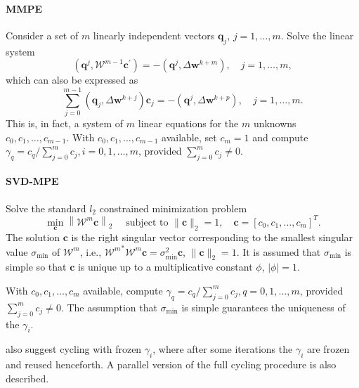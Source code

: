 \paragraph{MMPE}

Consider a set of \(m\) linearly independent vectors \(\mathbf q_j\), \(j=1, \dots, m\).
Solve the linear system
\begin{equation}
  \left(\mathbf q^{j}, \mathscr W^{m-1} \mathbf c^{\prime}\right)=-\left(\mathbf q^{j}, \Delta \mathbf w^{k+m}\right), \quad j=1, \ldots, m,
\end{equation}
which can also be expressed as
\begin{equation}
  \sum_{j=0}^{m-1}\left(\mathbf q_{j}, \Delta \mathbf w^{k+j}\right) \mathbf c_{j}=-\left(\mathbf q^{j}, \Delta \mathbf w^{k+p}\right), \quad j=1, \ldots, m.
\end{equation}
This is, in fact, a system of \(m\) linear equations for the \(m\) unknowns \(c_{0}, c_{1}, \ldots, c_{m-1}\).
With \(c_{0}, c_{1}, \ldots, c_{m-1}\) available, set \(c_{m}=1\) and compute \(\gamma_{q}=c_{q} / \sum_{j=0}^{m} c_{j}, i=0,1, \ldots, m\), provided \(\sum_{j=0}^{m} c_{j} \neq 0\).

\paragraph{SVD-MPE}

Solve the standard \(l_{2}\) constrained minimization problem
\begin{equation}
  \min_{\mathbf c}\left\|\mathscr W^{m} \mathbf c\right\|_{2} \quad \text { subject to }\|\mathbf c\|_{2}=1, \quad \mathbf c=\left[c_{0}, c_{1}, \ldots, c_{m}\right]^{T} .
\end{equation}
The solution \(\mathbf c\) is the right singular vector corresponding to the smallest singular value \(\sigma_{\min }\) of \(\mathscr W^{m}\), i.e., \({\mathscr W^{m}}^{*} \mathscr W^{m} \mathbf c=\sigma_{\min }^{2} \mathbf c\), \(\|\mathbf c\|_{2}=1\).
It is assumed that \(\sigma_{\min }\) is simple so that \(\mathbf c\) is unique up to a multiplicative constant \(\phi\), \(|\phi|=1\).

With \(c_{0}, c_{1}, \ldots, c_{m}\) available, compute \(\gamma_{q}=c_{q} / \sum_{j=0}^{m} c_{j}, q=0,1, \ldots, m\), provided \(\sum_{j=0}^{m} c_{j} \neq 0\).
The assumption that \(\sigma_{\min }\) is simple guarantees the uniqueness of the \(\gamma_{i}\).

\cite{sidi_vector_2017} also suggest cycling with frozen \(\gamma_i\), where after some iterations the \(\gamma_i\) are frozen and reused henceforth.
A parallel version of the full cycling procedure is also described.

